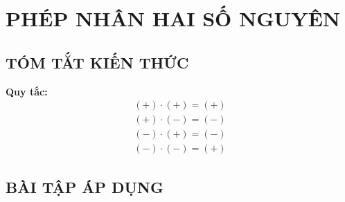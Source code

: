 \section{PHÉP NHÂN HAI SỐ NGUYÊN}
\subsection{TÓM TẮT KIẾN THỨC}
\begin{tomtat}

\textbf{Quy tắc:}
\begin{align*}
(+)\cdot(+) = (+)\\
(+)\cdot(-)= (-)\\
(-) \cdot (+) = (-)\\
(-)\cdot (-)= (+)
\end{align*}	
\end{tomtat}
\subsection{BÀI TẬP ÁP DỤNG}
